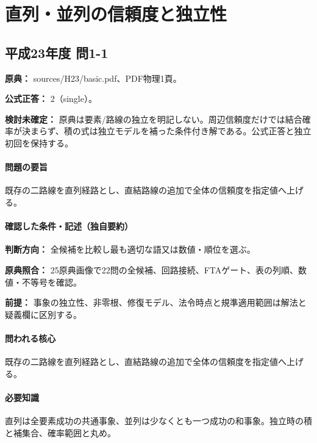 \section{直列・並列の信頼度と独立性}

\subsection{平成23年度 問1-1}
\label{q:h23-reg-basic-1-1}

\noindent\textbf{原典：} sources/H23/basic.pdf、PDF物理1頁。

\textbf{公式正答：} 2（single）。

\par\textbf{検討未確定：} 原典は要素/路線の独立を明記しない。周辺信頼度だけでは結合確率が決まらず、積の式は独立モデルを補った条件付き解である。公式正答と独立初回を保持する。

\paragraph{問題の要旨} 既存の二路線を直列経路とし、直結路線の追加で全体の信頼度を指定値へ上げる。

\paragraph{確認した条件・記述（独自要約）}\mbox{}\par

\noindent\textbf{判断方向：} 全候補を比較し最も適切な語又は数値・順位を選ぶ。\par

\noindent\textbf{原典照合：} 25原典画像で22問の全候補、回路接続、FTAゲート、表の列順、数値・不等号を確認。\par

\noindent\textbf{前提：} 事象の独立性、非零根、修復モデル、法令時点と規準適用範囲は解法と疑義欄に区別する。\par

\paragraph{問われる核心} 既存の二路線を直列経路とし、直結路線の追加で全体の信頼度を指定値へ上げる。

\paragraph{必要知識} 直列は全要素成功の共通事象、並列は少なくとも一つ成功の和事象。独立時の積と補集合、確率範囲と丸め。

